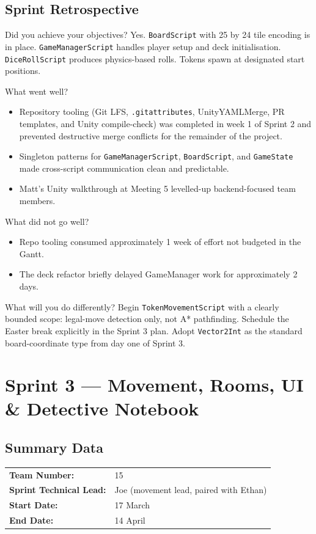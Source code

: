 \subsection*{Sprint Retrospective}

Did you achieve your objectives? Yes. \texttt{BoardScript} with 25 by 24 tile encoding is in place. \texttt{GameManagerScript} handles player setup and deck initialisation. \texttt{DiceRollScript} produces physics-based rolls. Tokens spawn at designated start positions.

What went well?
\begin{itemize}
    \item Repository tooling (Git LFS, \texttt{.gitattributes}, UnityYAMLMerge, PR templates, and Unity compile-check) was completed in week 1 of Sprint 2 and prevented destructive merge conflicts for the remainder of the project.
    \item Singleton patterns for \texttt{GameManagerScript}, \texttt{BoardScript}, and \texttt{GameState} made cross-script communication clean and predictable.
    \item Matt's Unity walkthrough at Meeting 5 levelled-up backend-focused team members.
\end{itemize}

What did not go well?
\begin{itemize}
    \item Repo tooling consumed approximately 1 week of effort not budgeted in the Gantt.
    \item The deck refactor briefly delayed GameManager work for approximately 2 days.
\end{itemize}

What will you do differently? Begin \texttt{TokenMovementScript} with a clearly bounded scope: legal-move detection only, not A* pathfinding. Schedule the Easter break explicitly in the Sprint 3 plan. Adopt \texttt{Vector2Int} as the standard board-coordinate type from day one of Sprint 3.

\section{Sprint 3 --- Movement, Rooms, UI \& Detective Notebook}
\label{sec:sprint3}

\subsection*{Summary Data}
\begin{tabular}{ll}
\textbf{Team Number:} & 15 \\
\textbf{Sprint Technical Lead:} & Joe (movement lead, paired with Ethan) \\
\textbf{Start Date:} & 17 March \\
\textbf{End Date:} & 14 April \\
\end{tabular}

